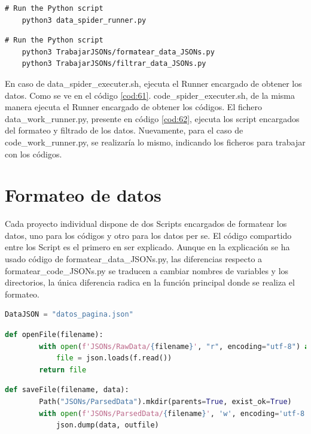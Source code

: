 \begin{lstlisting}[caption={Ejecución de data\_spider\_runner.py}, label=cod:61]
	# Run the Python script
	python3 data_spider_runner.py
\end{lstlisting}

\begin{lstlisting}[caption={Ejecución de data\_work\_runner.py}, label=cod:62]
	# Run the Python script
	python3 TrabajarJSONs/formatear_data_JSONs.py
	python3 TrabajarJSONs/filtrar_data_JSONs.py
\end{lstlisting}

En caso de data\_spider\_executer.sh, ejecuta el Runner encargado de obtener los datos. Como se ve en el código \ref{cod:61}. code\_spider\_executer.sh, de la misma manera ejecuta el Runner encargado de obtener los códigos. El fichero data\_work\_runner.py, presente en código \ref{cod:62}, ejecuta los script encargados del formateo y filtrado de los datos. Nuevamente, para el caso de code\_work\_runner.py, se realizaría lo mismo, indicando los ficheros para trabajar con los códigos. 

\section{Formateo de datos}
Cada proyecto individual dispone de dos Scripts encargados de formatear los datos, uno para los códigos y otro para los datos per se. El código compartido entre los Script es el primero en ser explicado. Aunque en la explicación se ha usado código de formatear\_data\_JSONs.py, las diferencias respecto a formatear\_code\_JSONs.py se traducen a cambiar nombres de variables y los directorios, la única diferencia radica en la función principal donde se realiza el formateo.

\begin{lstlisting}[language=Python, caption={Declaración variable del JSON que se desea usar}, label=cod:63]
	DataJSON = "datos_pagina.json"
\end{lstlisting}

\begin{lstlisting}[language=Python, caption={Declaración función \textit{openFile()}}, label=cod:64]
	def openFile(filename):
		with open(f'JSONs/RawData/{filename}', "r", encoding="utf-8") as f:
			file = json.loads(f.read())
		return file
\end{lstlisting}

\begin{lstlisting}[language=Python, caption={Declaración función \textit{saveFile()}}, label=cod:65]
	def saveFile(filename, data):
		Path("JSONs/ParsedData").mkdir(parents=True, exist_ok=True)
		with open(f'JSONs/ParsedData/{filename}', 'w', encoding='utf-8') as outfile:
			json.dump(data, outfile)
\end{lstlisting}

